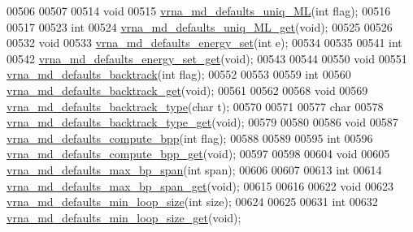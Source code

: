 \begin{DoxyCode}
00506 
00507 
00514 \textcolor{keywordtype}{void}
00515 \hyperlink{group__model__details_ga59b944f61c5d2babec2d4c48c820de67}{vrna\_md\_defaults\_uniq\_ML}(\textcolor{keywordtype}{int} flag);
00516 
00517 
00523 \textcolor{keywordtype}{int}
00524 \hyperlink{group__model__details_gab48e70fd024bf838404bcbcca0c874a0}{vrna\_md\_defaults\_uniq\_ML\_get}(\textcolor{keywordtype}{void});
00525 
00526 
00532 \textcolor{keywordtype}{void}
00533 \hyperlink{group__model__details_ga8dd29c55787a4576277e1907e92d810c}{vrna\_md\_defaults\_energy\_set}(\textcolor{keywordtype}{int} e);
00534 
00535 
00541 \textcolor{keywordtype}{int}
00542 \hyperlink{group__model__details_ga017ed6afb1cba2b7f242412cab618b53}{vrna\_md\_defaults\_energy\_set\_get}(\textcolor{keywordtype}{void});
00543 
00544 
00550 \textcolor{keywordtype}{void}
00551 \hyperlink{group__model__details_ga978c468b2fe96a70d5191e3dd17d5599}{vrna\_md\_defaults\_backtrack}(\textcolor{keywordtype}{int} flag);
00552 
00553 
00559 \textcolor{keywordtype}{int}
00560 \hyperlink{group__model__details_ga90da1156e6883ddd68527c2830706648}{vrna\_md\_defaults\_backtrack\_get}(\textcolor{keywordtype}{void});
00561 
00562 
00568 \textcolor{keywordtype}{void}
00569 \hyperlink{group__model__details_ga68305274de96b56b7799575e222560d8}{vrna\_md\_defaults\_backtrack\_type}(\textcolor{keywordtype}{char} t);
00570 
00571 
00577 \textcolor{keywordtype}{char}
00578 \hyperlink{group__model__details_ga1425b4ebd0e034dead66d79becd64143}{vrna\_md\_defaults\_backtrack\_type\_get}(\textcolor{keywordtype}{void});
00579 
00580 
00586 \textcolor{keywordtype}{void}
00587 \hyperlink{group__model__details_gaf1b5db10f1f476767f9a95f8a78e3132}{vrna\_md\_defaults\_compute\_bpp}(\textcolor{keywordtype}{int} flag);
00588 
00589 
00595 \textcolor{keywordtype}{int}
00596 \hyperlink{group__model__details_gaa3a537e61fbe0518673bf9f73fd820f3}{vrna\_md\_defaults\_compute\_bpp\_get}(\textcolor{keywordtype}{void});
00597 
00598 
00604 \textcolor{keywordtype}{void}
00605 \hyperlink{group__model__details_ga4c4bc962f09b4480cb8499f1cf8ae4ec}{vrna\_md\_defaults\_max\_bp\_span}(\textcolor{keywordtype}{int} span);
00606 
00607 
00613 \textcolor{keywordtype}{int}
00614 \hyperlink{group__model__details_gaa60f989e062fecd4d4bac89c1883da85}{vrna\_md\_defaults\_max\_bp\_span\_get}(\textcolor{keywordtype}{void});
00615 
00616 
00622 \textcolor{keywordtype}{void}
00623 \hyperlink{group__model__details_gac152f1e78c1058a10261022c8dfda0f7}{vrna\_md\_defaults\_min\_loop\_size}(\textcolor{keywordtype}{int} size);
00624 
00625 
00631 \textcolor{keywordtype}{int}
00632 \hyperlink{group__model__details_ga5cc691174a75c652807dc361b617632a}{vrna\_md\_defaults\_min\_loop\_size\_get}(\textcolor{keywordtype}{void});

\end{DoxyCode}
